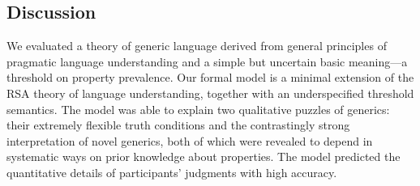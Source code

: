 \documentclass{pnastwo}
\begin{document}
\begin{article}



%

\section{Discussion}

We evaluated a theory of generic language derived from general principles of pragmatic language understanding and a simple but uncertain basic meaning---a threshold on property prevalence.
Our formal model is a minimal extension of the RSA theory of language understanding, together with an underspecified threshold semantics.
The model was able to explain two qualitative puzzles of generics: their extremely flexible truth conditions and the contrastingly strong interpretation of novel generics, both of which were revealed to depend in systematic ways on prior knowledge about properties. The model predicted the quantitative details of participants' judgments with high accuracy.


\end{article}
\end{document}
